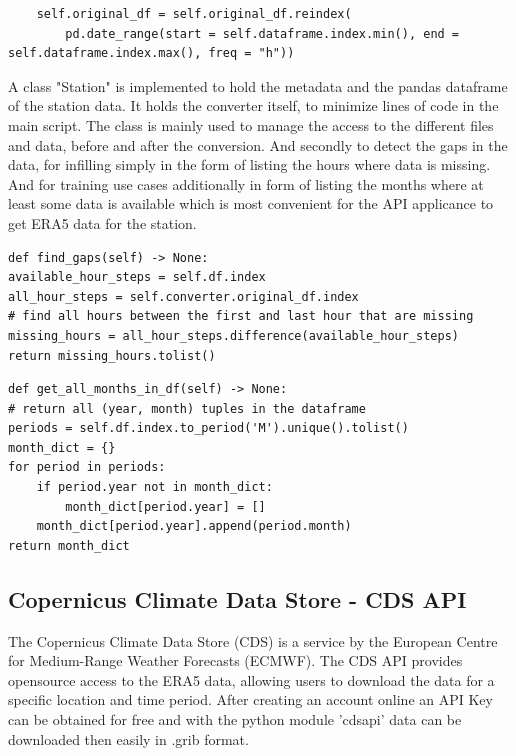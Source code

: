 \begin{lstlisting}
    self.original_df = self.original_df.reindex(
        pd.date_range(start = self.dataframe.index.min(), end = self.dataframe.index.max(), freq = "h"))
\end{lstlisting}

A class "Station" is implemented to hold the metadata and the pandas dataframe of the station data. It holds the converter itself, to minimize lines of code in the main script. The class is mainly used to manage the access to the different files and data, before and after the conversion. And secondly to detect the gaps in the data, for infilling simply in the form of listing the hours where data is missing. And for training use cases additionally in form of listing the months where at least some data is available which is most convenient for the API applicance to get ERA5 data for the station.


\begin{lstlisting}[caption=Gap Detection in Station Class, label=lst:find_gaps]
def find_gaps(self) -> None:
available_hour_steps = self.df.index
all_hour_steps = self.converter.original_df.index
# find all hours between the first and last hour that are missing
missing_hours = all_hour_steps.difference(available_hour_steps)
return missing_hours.tolist()
\end{lstlisting}

\begin{lstlisting}[caption=Detection of available ranges in Station Class, label=lst:available_ranges]
def get_all_months_in_df(self) -> None:
# return all (year, month) tuples in the dataframe
periods = self.df.index.to_period('M').unique().tolist()
month_dict = {}
for period in periods:
    if period.year not in month_dict:
        month_dict[period.year] = []
    month_dict[period.year].append(period.month)
return month_dict
\end{lstlisting}

\subsection{Copernicus Climate Data Store - CDS API}
\label{sec:cds_api}

The Copernicus Climate Data Store (CDS) is a service by the European Centre for Medium-Range Weather Forecasts (ECMWF). The CDS API provides opensource access to the ERA5 data, allowing users to download the data for a specific location and time period. After creating an account online an API Key can be obtained for free and with the python module 'cdsapi' data can be downloaded then easily in .grib format. 

